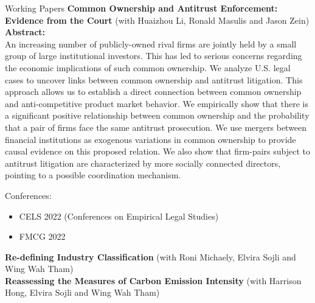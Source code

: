 \documentclass{resume} %
\begin{document}
\begin{rSection}{Working Papers}
	{\bf Common Ownership and Antitrust Enforcement: Evidence from the Court} (with Huaizhou Li, Ronald Masulis and Jason Zein)\\
	{\bf Abstract:}\\
	An increasing number of publicly-owned rival firms are jointly held by a small group of large institutional investors. This has led to serious concerns regarding the economic implications of such common ownership. We analyze U.S. legal cases to uncover links between common ownership and antitrust litigation. This approach allows us to establish a direct connection between common ownership and anti-competitive product market behavior. We empirically show that there is a significant positive relationship between common ownership and the probability that a pair of firms face the same antitrust prosecution. We use mergers between financial institutions as exogenous variations in common ownership to provide causal evidence on this proposed relation. We also show that firm-pairs subject to antitrust litigation are characterized by more socially connected directors, pointing to a possible coordination mechanism.

	Conferences:

	\begin{itemize}
		\item CELS 2022 (Conferences on Empirical Legal Studies)
		\item FMCG 2022
	\end{itemize}

	{\bf Re-defining Industry Classification} (with Roni Michaely, Elvira Sojli and Wing Wah Tham)\\

	{\bf Reassessing the Measures of Carbon Emission Intensity} (with Harrison Hong, Elvira Sojli and Wing Wah Tham)\\


\end{rSection}
\end{document}
